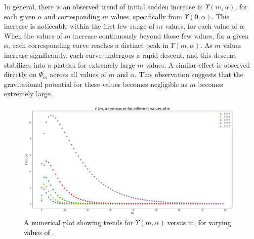 \documentclass{article}
\begin{document}

In general, there is an observed trend of initial sudden increase in $\Upsilon(m,\alpha)$, for each given $\alpha$ and corresponding $m$ values, specifically from $\Upsilon(0,\alpha)$. This increase is noticeable within the first few range of $m$ values, for each value of $\alpha$. When the values of $m$ increase continuously beyond those few values, for a given $\alpha$, each corresponding curve reaches a distinct peak in $\Upsilon(m,\alpha)$. As $m$ values increase significantly, each curve undergoes a rapid descent, and this descent stabilizes into a plateau for extremely large $m$ values. A similar effect is observed directly on $\Psi_{m}^{'}$ across all values of $m$ and $\alpha$. This observation suggests that the gravitational potential for these values becomes negligible as $m$ becomes extremely large.

\begin{figure}
    \centering
    \includegraphics[width=1.0\linewidth]{image.png}
    \caption{A numerical plot showing trends for $\Upsilon(m,\alpha)$ versus m, for varying values of \alpha.}
    \label{fig:enter-label}
\end{figure}
\end{document}
